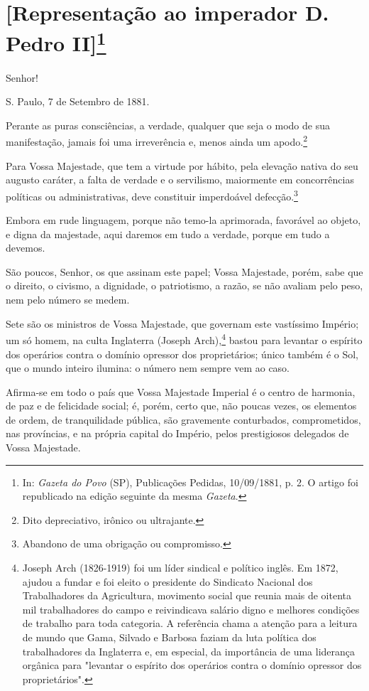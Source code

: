 {\chapter{{[}Representação ao imperador D.\,Pedro II{]}\footnote[*]{In:
  \emph{Gazeta do Povo} (SP), Publicações Pedidas, 10/09/1881, p. 2. O
  artigo foi republicado na edição seguinte da mesma \emph{Gazeta}.}}

Senhor!

S. Paulo, 7 de Setembro de 1881.

Perante as puras consciências, a verdade, qualquer que seja o modo de
sua manifestação, jamais foi uma irreverência e, menos ainda um
apodo.\footnote{Dito depreciativo, irônico ou ultrajante.}

Para Vossa Majestade, que tem a virtude por hábito, pela elevação nativa
do seu augusto caráter, a falta de verdade e o servilismo, maiormente em
concorrências políticas ou administrativas, deve constituir imperdoável
defecção.\footnote{Abandono de uma obrigação ou compromisso.}

Embora em rude linguagem, porque não temo-la aprimorada, favorável ao
objeto, e digna da majestade, aqui daremos em tudo a verdade, porque em
tudo a devemos.

São poucos, Senhor, os que assinam este papel; Vossa Majestade, porém,
sabe que o direito, o civismo, a dignidade, o patriotismo, a razão, se
não avaliam pelo peso, nem pelo número se medem.

Sete são os ministros de Vossa Majestade, que governam este vastíssimo
Império; um só homem, na culta Inglaterra (Joseph Arch),\footnote{
  Joseph Arch (1826-1919) foi um líder sindical e político inglês. Em
  1872, ajudou a fundar e foi eleito o presidente do Sindicato Nacional
  dos Trabalhadores da Agricultura, movimento social que reunia mais de
  oitenta mil trabalhadores do campo e reivindicava salário digno e
  melhores condições de trabalho para toda categoria. A referência chama
  a atenção para a leitura de mundo que Gama, Silvado e Barbosa faziam
  da luta política dos trabalhadores da Inglaterra e, em especial, da
  importância de uma liderança orgânica para "levantar o espírito dos
  operários contra o domínio opressor dos proprietários".} bastou para
levantar o espírito dos operários contra o domínio opressor dos
proprietários; único também é o Sol, que o mundo inteiro ilumina: o
número nem sempre vem ao caso.

Afirma-se em todo o país que Vossa Majestade Imperial é o centro de
harmonia, de paz e de felicidade social; é, porém, certo que, não poucas
vezes, os elementos de ordem, de tranquilidade pública, são gravemente
conturbados, comprometidos, nas províncias, e na própria capital do
Império, pelos prestigiosos delegados de Vossa Majestade.

}
